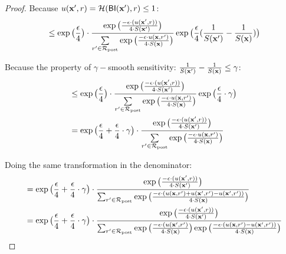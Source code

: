 \documentclass{article}
\begin{document}
\begin{proof}
  Because $u(\textbf{x}', {r}) = \mathcal{H}(\mathsf{BI}(\textbf{x}'), r) \leq 1$:
  \begin{equation*}
  \begin{split}
  & \leq \exp\big( \frac{\epsilon}{4} \big) \cdot 
  \frac {
  \exp
  \big(
  \frac{-\epsilon\cdot(u(\textbf{x}', {r}))}{4\cdot S(\textbf{x}')}
  \big)
  } 
  {\sum\limits_{r'\in \mathcal{R}_{\textup{post}}} \exp \big(\frac{-\epsilon\cdot u(\textbf{x}, r')}{4 \cdot S(\textbf{x})}\big)}
  \exp
  \big(
  \frac{\epsilon}{4}(\frac{1}{S(\textbf{x}')} - \frac{1}{S(\textbf{x})})
  \big)\\
  \end{split}
  \end{equation*}

  Because the property of $\gamma -$smooth sensitivity: $\frac{1}{S(\textbf{x}')} - \frac{1}{S(\textbf{x})} \leq \gamma$:  
  \begin{equation*}
  \begin{split}
  & \leq \exp\big( \frac{\epsilon}{4} \big) \cdot 
  \frac {
  \exp
  \big(
  \frac{-\epsilon\cdot(u(\textbf{x}', {r}))}{4\cdot S(\textbf{x}')}
  \big)
  } 
  {\sum\limits_{r'\in \mathcal{R}_{\textup{post}}} \exp \big(\frac{-\epsilon\cdot u(\textbf{x}, r')}{4 \cdot S(\textbf{x})}\big)}
  \exp
  \big(
  \frac{\epsilon}{4} \cdot \gamma
  \big)\\
  & = \exp\big( \frac{\epsilon}{4} + \frac{\epsilon}{4} \cdot \gamma\big) \cdot 
  \frac {
  \exp
  \big(
  \frac{-\epsilon\cdot(u(\textbf{x}', {r}))}{4\cdot S(\textbf{x}')}
  \big)
  } 
  {\sum\limits_{r'\in \mathcal{R}_{\textup{post}}} \exp \big(\frac{-\epsilon\cdot u(\textbf{x}, r')}{4 \cdot S(\textbf{x})}\big)}\\
  \end{split}
  \end{equation*}

  Doing the same transformation in the denominator:
  \begin{equation*}
  \begin{split}
  & = \exp\big( \frac{\epsilon}{4} + \frac{\epsilon}{4} \cdot \gamma\big) \cdot 
  \frac {
  \exp
  \big(
  \frac{-\epsilon\cdot(u(\textbf{x}', {r}))}{4\cdot S(\textbf{x}')}
  \big)
  } 
  {
  \sum_{r'\in \mathcal{R}_{\textup{post}}} 
  \exp 
  \big(
  \frac{-\epsilon\cdot(u(\textbf{x}, {r'}) + u(\textbf{x}', {r'}) - u(\textbf{x}', {r'}))}{4 \cdot S(\textbf{x})}
  \big)
  }\\
  & = \exp\big( \frac{\epsilon}{4} + \frac{\epsilon}{4} \cdot \gamma\big) \cdot 
  \frac {
  \exp
  \big(
  \frac{-\epsilon\cdot(u(\textbf{x}', {r}))}{4\cdot S(\textbf{x}')}
  \big)
  } 
  {
  \sum_{r'\in \mathcal{R}_{\textup{post}}} 
  \exp 
  \big(
  \frac{-\epsilon\cdot(u(\textbf{x}', {r'})}{4 \cdot S(\textbf{x})}
  \big)
  \exp 
  \big(
  \frac{-\epsilon\cdot(u(\textbf{x}, {r'}) - u(\textbf{x}', {r'}))}{4 \cdot S(\textbf{x})}
  \big)
  }\\
  \end{split}
  \end{equation*}


\end{proof}
\end{document}

